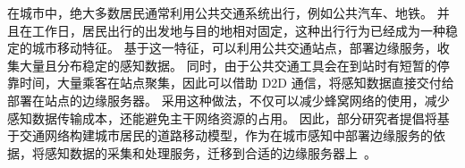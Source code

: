 在城市中，绝大多数居民通常利用公共交通系统出行，例如公共汽车、地铁。
并且在工作日，居民出行的出发地与目的地相对固定，这种出行行为已经成为一种稳定的城市移动特征。
基于这一特征，可以利用公共交通站点，部署边缘服务，收集大量且分布稳定的感知数据。
同时，由于公共交通工具会在到站时有短暂的停靠时间，大量乘客在站点聚集，因此可以借助 D2D 通信，将感知数据直接交付给部署在站点的边缘服务器。
采用这种做法，不仅可以减少蜂窝网络的使用，减少感知数据传输成本，还能避免主干网络资源的占用。
因此，部分研究者提倡将基于交通网络构建城市居民的道路移动模型，作为在城市感知中部署边缘服务的依据，将感知数据的采集和处理服务，迁移到合适的边缘服务器上~\cite{DBLP:journals/iotj/ZhanXZW18}。





